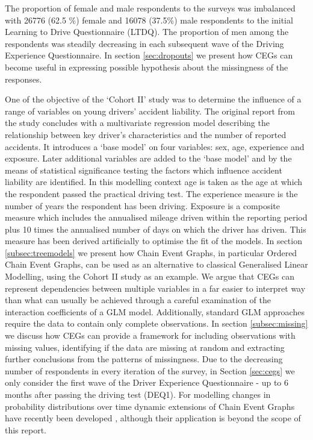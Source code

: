 \documentclass[runningheads]{llncs}
\begin{document}
The proportion of female and male respondents to the surveys was imbalanced with 26776 (62.5 \%) female and 16078 (37.5\%) male respondents to the initial Learning to Drive Questionnaire (LTDQ). The proportion of men among the respondents was steadily decreasing in each subsequent wave of the Driving Experience Questionnaire. In section \ref{sec:dropouts} we present how CEGs can become useful in expressing possible hypothesis about the missingness of the responses.

One of the objective of the `Cohort II' study was to determine the influence of a range of variables on young drivers’ accident liability. The original report from the study concludes with a multivariate regression model describing the relationship between key driver's characteristics and the number of reported accidents. It introduces a `base model' on four variables: sex, age, experience and exposure. Later additional variables are added to the `base model' and by the means of statistical significance testing the factors which influence accident liability are identified. In this modelling context age is taken as the age at which the respondent passed the practical driving test. The experience measure is the number of years the respondent has been driving. Exposure is a composite measure which includes the annualised mileage driven within the reporting period plus 10 times the annualised number of days on which the driver has driven. This measure has been derived artificially to optimise the fit of the models. 
In section \ref{subsec:treemodels} we present how Chain Event Graphs, in particular Ordered Chain Event Graphs, can be used as an alternative to classical Generalised Linear Modelling, using the Cohort II study as an example. We argue that CEGs can represent dependencies between multiple variables in a far easier to interpret way than what can usually be achieved through a careful examination of the interaction coefficients of a GLM model. Additionally, standard GLM approaches require the data to contain only complete observations. In section \ref{subsec:missing} we discuss how CEGs can provide a framework for including observations with missing values, identifying if the data are missing at random and extracting further conclusions from the patterns of missingness.
Due to the decreasing number of respondents in every iteration of the survey, in Section \ref{sec:cegs} we only consider the first wave of the Driver Experience Questionnaire - up to 6 months after passing the driving test (DEQ1). For modelling changes in probability distributions over time dynamic extensions of Chain Event Graphs have recently been developed \cite{barclay2015dynamic,collazo2017thesis}, although their application is beyond the scope of this report.
\end{document}
